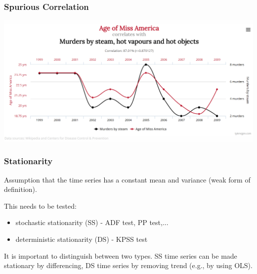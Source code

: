 \documentclass[12pt]{beamer}\usepackage[]{graphicx}\usepackage[]{color}
\makeatletter
\newcommand{\hlopt}[1]{\textcolor[rgb]{0,0,0}{#1}}%
\newcommand{\hlstd}[1]{\textcolor[rgb]{0.345,0.345,0.345}{#1}}%
\newcommand{\hlkwd}[1]{\textcolor[rgb]{0.737,0.353,0.396}{\textbf{#1}}}%
\newenvironment{kframe}{%
 \def\at@end@of@kframe{}%
 \ifinner\ifhmode%
  \def\at@end@of@kframe{\end{minipage}}%
  \begin{minipage}{\columnwidth}%
 \fi\fi%
 \def\FrameCommand##1{\hskip\@totalleftmargin \hskip-\fboxsep
 \colorbox{shadecolor}{##1}\hskip-\fboxsep
     \hskip-\linewidth \hskip-\@totalleftmargin \hskip\columnwidth}%
 \MakeFramed {\advance\hsize-\width
   \@totalleftmargin\z@ \linewidth\hsize
   \@setminipage}}%
 {\par\unskip\endMakeFramed%
 \at@end@of@kframe}
\newenvironment{knitrout}{}{} %
\makeatother
\begin{document}

\begin{frame}\frametitle{Spurious Correlation}
 \includegraphics[height=0.8\paperheight,width=0.8\paperwidth]{./Images/spurious}
\end{frame}


\begin{frame}\large
\frametitle{Stationarity}

Assumption that the time series has a constant mean and variance (weak form of definition).

This needs to be tested:

\begin{itemize}
 \item stochastic stationarity (SS) - ADF test, PP test,...
 \item deterministic stationarity (DS) - KPSS test
\end{itemize}

It is important to distinguish between two types. SS time series can be made stationary by differencing, DS time series by removing trend (e.g., by using OLS).


\end{frame}


\end{document}
